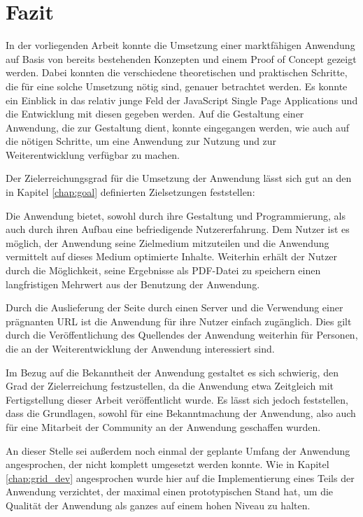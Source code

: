 \chapter{Fazit}
\thispagestyle{fancy}

In der vorliegenden Arbeit konnte die Umsetzung einer marktfähigen Anwendung auf Basis von bereits bestehenden Konzepten und einem Proof of Concept gezeigt werden.
Dabei konnten die verschiedene theoretischen und praktischen Schritte, die für eine solche Umsetzung nötig sind, genauer betrachtet werden.
Es konnte ein Einblick in das relativ junge Feld der JavaScript Single Page Applications und die Entwicklung mit diesen gegeben werden. Auf die Gestaltung einer Anwendung, die zur Gestaltung dient, konnte eingegangen werden, wie auch auf die nötigen Schritte, um eine Anwendung zur Nutzung und zur Weiterentwicklung verfügbar zu machen.

Der Zielerreichungsgrad für die Umsetzung der Anwendung lässt sich gut an den in Kapitel \ref{chap:goal} definierten Zielsetzungen feststellen:

Die Anwendung bietet, sowohl durch ihre Gestaltung und Programmierung, als auch durch ihren Aufbau eine befriedigende Nutzererfahrung. Dem Nutzer ist es möglich, der Anwendung seine Zielmedium mitzuteilen und die Anwendung vermittelt auf dieses Medium optimierte Inhalte. Weiterhin erhält der Nutzer durch die Möglichkeit, seine Ergebnisse als PDF-Datei zu speichern einen langfristigen Mehrwert aus der Benutzung der Anwendung.

Durch die Auslieferung der Seite durch einen Server und die Verwendung einer prägnanten URL ist die Anwendung für ihre Nutzer einfach zugänglich. Dies gilt durch die Veröffentlichung des Quellendes der Anwendung weiterhin für Personen, die an der Weiterentwicklung der Anwendung interessiert sind.

Im Bezug auf die Bekanntheit der Anwendung gestaltet es sich schwierig, den Grad der Zielerreichung festzustellen, da die Anwendung etwa Zeitgleich mit Fertigstellung dieser Arbeit veröffentlicht wurde.
Es lässt sich jedoch feststellen, dass die Grundlagen, sowohl für eine Bekanntmachung der Anwendung, also auch für eine Mitarbeit der Community an der Anwendung geschaffen wurden.

An dieser Stelle sei außerdem noch einmal der geplante Umfang der Anwendung angesprochen, der nicht komplett umgesetzt werden konnte.
Wie in Kapitel \ref{chap:grid_dev} angesprochen wurde hier auf die Implementierung eines Teils der Anwendung verzichtet, der maximal einen prototypischen Stand hat, um die Qualität der Anwendung als ganzes auf einem hohen Niveau zu halten.

